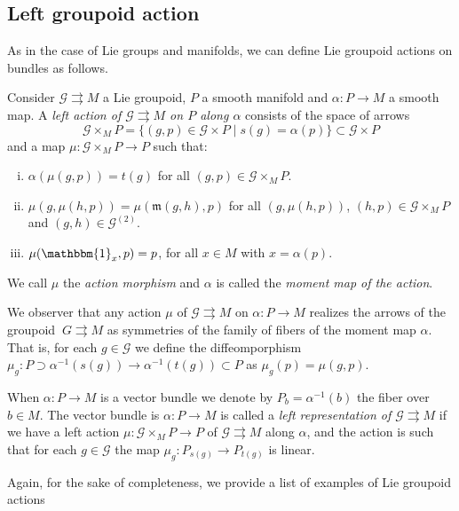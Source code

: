 \documentclass[12pt,a4paper,reqno]{amsart}
\newcommand{\1}{\mathbbm{1}} %
\newcommand{\G}{\mathcal{G}} %
\newcommand{\m}{\mathfrak{m}} %
\theoremstyle{definition}
\theoremstyle{TheoremNum}
\begin{document}
\subsection{Left groupoid action} As in the case of Lie groups and manifolds, we can define Lie groupoid actions on bundles as follows. 

Consider $\G\rightrightarrows M$ a Lie groupoid, $P$ a smooth manifold and $\alpha\colon P\to M$ a smooth map. A \emph{left action of $\G\rightrightarrows M$ on $P$ along $\alpha$} consists of the space of arrows 
\[
\G\times_M P = \{(g,p)\in \G\times P\mid s(g) = \alpha(p)\}\subset \G\times P
\] 
and a map $\mu\colon \G\times_M P\to P$ such that: 
\begin{enumerate}[(i)]
\item $\alpha(\mu(g,p)) = t(g)$ for all $(g,p)\in \G\times_M P$.
\item $\mu(g,\mu(h,p)) = \mu(\m(g,h),p)$ for all $(g,\mu(h,p))$, $(h,p)\in \G\times_M P$ and $(g,h)\in \G^{(2)}$.
\item $\mu(\1_{x},p) = p$, for all $x\in M$ with $x = \alpha(p)$.
\end{enumerate}
We call $\mu$ the \emph{action morphism} and $\alpha$ is called the \emph{moment map of the action}. 

We observer that any action $\mu$ of $\G\rightrightarrows M$ on $\alpha\colon P\to M$ realizes the arrows of the groupoid $\	G \rightrightarrows M$ as symmetries of the family of fibers of the moment map $\alpha$. That is, for each $g\in \G$ we define the diffeomporphism $\mu_g\colon P \supset \alpha^{-1}(s(g))\to \alpha^{-1}(t(g))\subset P$ as $\mu_g(p ) = \mu(g,p)$. 


When $\alpha\colon P\to M$ is a vector bundle we denote by $P_b = \alpha^{-1}(b)$ the fiber over $b\in M$. The vector bundle is $\alpha\colon P\to M$ is called a \emph{left  representation of $\G\rightrightarrows M$} if we have a left action $\mu\colon \G\times_M P\to P$ of $\G\rightrightarrows M$ along $\alpha$, and the action is such that for each $g\in \G$ the map $\mu_g\colon P_{s(g)}\to P_{t(g)}$ is linear. 

Again, for the sake of completeness, we provide a list of examples of Lie groupoid actions
\end{document}
